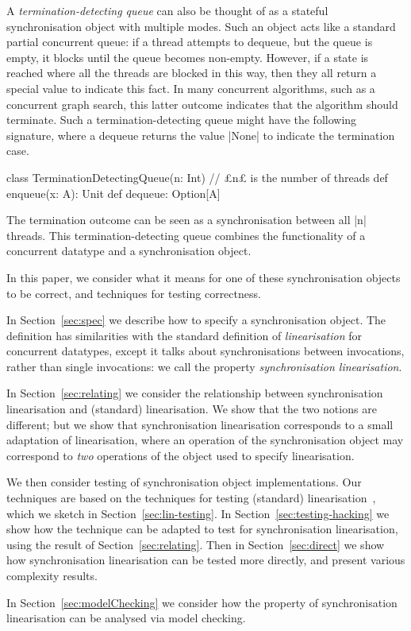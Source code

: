A \emph{termination-detecting queue} can also be thought of as a stateful
synchronisation object with multiple modes.  Such an object acts like a
standard partial concurrent queue: if a thread attempts to dequeue, but the
queue is empty, it blocks until the queue becomes non-empty.  However, if a
state is reached where all the threads are blocked in this way, then they all
return a special value to indicate this fact.  In many concurrent algorithms,
such as a concurrent graph search, this latter outcome indicates that the
algorithm should terminate.  Such a termination-detecting queue might have the
following signature, where a dequeue returns the value |None| to indicate the
termination case.
%
\begin{scala}
class TerminationDetectingQueue(n: Int){ // £n£ is the number of threads   
  def enqueue(x: A): Unit
  def dequeue: Option[A]
}
\end{scala} 
%
The termination outcome can be seen as a synchronisation between all |n|
threads.  This termination-detecting queue combines the functionality of a
concurrent datatype and a synchronisation object.



In this paper, we consider what it means for one of these synchronisation
objects to be correct, and techniques for testing correctness.  

In Section~\ref{sec:spec} we describe how to specify a synchronisation
object.  The definition has similarities with the standard definition of
\emph{linearisation} for concurrent datatypes, except it talks about
synchronisations between invocations, rather than single invocations: we call
the property \emph{synchronisation linearisation}. 

In Section~\ref{sec:relating} we consider the relationship between
synchronisation linearisation and (standard) linearisation.  We show that the
two notions are different; but we show that synchronisation linearisation
corresponds to a small adaptation of linearisation, where an
operation of the synchronisation object may correspond to \emph{two} operations
of the object used to specify linearisation.  

We then consider testing of synchronisation object implementations.  Our
techniques are based on the techniques for testing (standard)
linearisation~\cite{gavin:lin-testing}, which we sketch in
Section~\ref{sec:lin-testing}.  In Section~\ref{sec:testing-hacking} we show
how the technique can be adapted to test for synchronisation linearisation,
using the result of Section~\ref{sec:relating}.  Then in
Section~\ref{sec:direct} we show how synchronisation linearisation can be
tested more directly, and present various complexity results.

In Section~\ref{sec:modelChecking} we consider how the property of
synchronisation linearisation can be analysed via model checking.  

